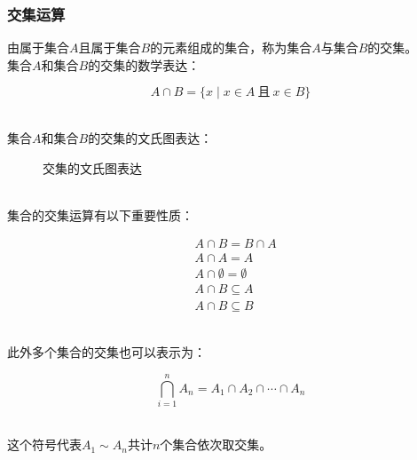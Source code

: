 \documentclass[UTF8]{ctexart}
\begin{document}
\newpage

\subsubsection{交集运算}
    由属于集合$A$且属于集合$B$的元素组成的集合，称为集合$A$与集合$B$的交集。\\[3mm]
    集合$A$和集合$B$的交集的数学表达：
    \begin{large}
        \begin{equation*}
            A\cap B=\big\{ x\mid x\in A~\text{且}~x\in B\big\}
        \end{equation*}
    \end{large}\\
    集合$A$和集合$B$的交集的文氏图表达：
    \begin{figure}[h]
        \begin{center}
            \caption{交集的文氏图表达}
        \end{center}
    \end{figure}\\
    集合的交集运算有以下重要性质：
    \begin{large}
        \begin{align*}
            &A\cap B=B\cap A\\[3mm]
            &A\cap A=A\\[3mm]
            &A\cap \emptyset=\emptyset\\[3mm]
            &A\cap B\subseteq A\\[3mm]
            &A\cap B\subseteq B
        \end{align*}
    \end{large}\\
    此外多个集合的交集也可以表示为：
    \begin{large}
        \begin{equation*}
            \bigcap_{i=1}^{n}A_n=A_1\cap A_2\cap\cdots\cap A_n
        \end{equation*}
    \end{large}\\
    这个符号代表$A_1\sim A_n$共计$n$个集合依次取交集。
\end{document}

